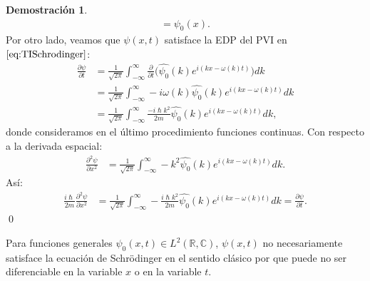 \documentclass[12pt]{article}
\theoremstyle{definition}
\newtheorem*{demo}{Demostración}
\newcommand*{\field}[1]{\mathbb{#1}}
\begin{document}
\begin{demo}
\begin{align*}
        = 
        \psi_{0}(x) .
    \end{align*}
    Por otro lado, veamos que $\psi(x,t)$ satisface la EDP del PVI en $\eqref{eq:TISchrodinger}$:
    \begin{align*}
        \frac{\partial\psi}{\partial t} & = \frac{1}{\sqrt{2\pi}}\int^{\infty}_{-\infty}\frac{\partial}{\partial t}\bigg(\hat{\psi_{0}}(k)e^{i(kx-\omega(k)t)}\bigg)dk
        \\
        & =
        \frac{1}{\sqrt{2\pi}}\int^{\infty}_{-\infty}-i\omega(k)\hat{\psi_{0}}(k)e^{i(kx-\omega(k)t)}dk
        \\
        & =
        \frac{1}{\sqrt{2\pi}}\int^{\infty}_{-\infty}\frac{-i\hslash k^2}{2m}\hat{\psi_{0}}(k)e^{i(kx-\omega(k)t)}dk,
    \end{align*}
    donde consideramos en el último procedimiento funciones continuas. Con respecto a la derivada espacial:
    \begin{align*}
        \frac{\partial^2\psi}{\partial x^2} & = \frac{1}{\sqrt{2\pi}}\int^{\infty}_{-\infty}-k^2\hat{\psi_{0}}(k)e^{i(kx-\omega(k)t)}dk.
    \end{align*}
    Así:
    \begin{align*}
        \frac{i\hslash}{2m}\frac{\partial^2\psi}{\partial x^2} & = \frac{1}{\sqrt{2\pi}}\int^{\infty}_{-\infty}-\frac{i\hslash k^2}{2m}\hat{\psi_{0}}(k)e^{i(kx-\omega(k)t)}dk
         =
        \frac{\partial\psi}{\partial t}.
    \end{align*}
    \qed
\end{demo}
\noindent
Para funciones generales $\psi_{0}(x,t)\in L^2(\field{R},\field{C})$, $\psi(x,t)$ no necesariamente satisface la ecuación de Schrödinger en el sentido clásico por que puede no ser diferenciable en la variable $x$ o en la variable $t$.
\end{document}

